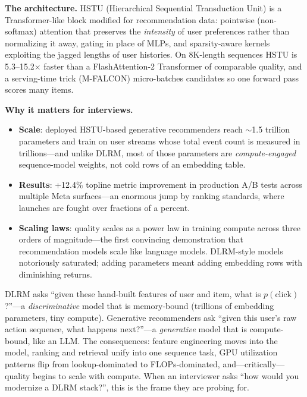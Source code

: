 \textbf{The architecture.} HSTU (Hierarchical Sequential Transduction Unit) is a Transformer-like block modified for recommendation data: pointwise (non-softmax) attention that preserves the \textit{intensity} of user preferences rather than normalizing it away, gating in place of MLPs, and sparsity-aware kernels exploiting the jagged lengths of user histories. On 8K-length sequences HSTU is 5.3--15.2$\times$ faster than a FlashAttention-2 Transformer of comparable quality, and a serving-time trick (M-FALCON) micro-batches candidates so one forward pass scores many items.

\textbf{Why it matters for interviews.}
\begin{itemize}
    \item \textbf{Scale}: deployed HSTU-based generative recommenders reach $\sim$1.5 trillion parameters and train on user streams whose total event count is measured in trillions---and unlike DLRM, most of those parameters are \textit{compute-engaged} sequence-model weights, not cold rows of an embedding table.
    \item \textbf{Results}: +12.4\% topline metric improvement in production A/B tests across multiple Meta surfaces---an enormous jump by ranking standards, where launches are fought over fractions of a percent.
    \item \textbf{Scaling laws}: quality scales as a power law in training compute across three orders of magnitude---the first convincing demonstration that recommendation models scale like language models. DLRM-style models notoriously saturated; adding parameters meant adding embedding rows with diminishing returns.
\end{itemize}

\begin{keyinsight}
DLRM asks ``given these hand-built features of user and item, what is $p(\text{click})$?''---a \textit{discriminative} model that is memory-bound (trillions of embedding parameters, tiny compute). Generative recommenders ask ``given this user's raw action sequence, what happens next?''---a \textit{generative} model that is compute-bound, like an LLM. The consequences: feature engineering moves into the model, ranking and retrieval unify into one sequence task, GPU utilization patterns flip from lookup-dominated to FLOPs-dominated, and---critically---quality begins to scale with compute. When an interviewer asks ``how would you modernize a DLRM stack?'', this is the frame they are probing for.
\end{keyinsight}

